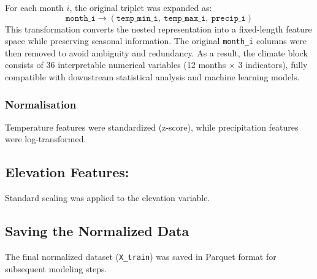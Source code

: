 For each month $i$, the original triplet was expanded as:
\[
\texttt{month\_i} \rightarrow (\texttt{temp\_min\_i},\ \texttt{temp\_max\_i},\ \texttt{precip\_i})
\]
This transformation converts the nested representation into a fixed-length feature space while preserving seasonal information. The original \texttt{month\_i} columns were then removed to avoid ambiguity and redundancy. As a result, the climate block consists of 36 interpretable numerical variables (12 months $\times$ 3 indicators), fully compatible with downstream statistical analysis and machine learning models.

\subsubsection{Normalisation}
Temperature features were standardized (z-score), while precipitation features were log-transformed.

\subsection{Elevation Features:} 
Standard scaling was applied to the elevation variable.


\subsection{Saving the Normalized Data}
The final normalized dataset (\texttt{X\_train}) was saved in Parquet format for subsequent modeling steps.
